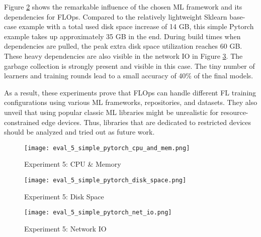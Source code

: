 Figure \ref{fig:eval_5_disk_space} shows the remarkable influence of the chosen ML framework and its dependencies for FLOps.
Compared to the relatively lightweight Sklearn base-case example with a total used disk space increase of 14 GB, this simple Pytorch example takes up approximately 35 GB in the end.
During build times when dependencies are pulled, the peak extra disk space utilization reaches 60 GB.
These heavy dependencies are also visible in the network IO in Figure \ref{fig:eval_5_net_io}.
The garbage collection is strongly present and visible in this case.
The tiny number of learners and training rounds lead to a small accuracy of 40\% of the final models.

As a result, these experiments prove that FLOps can handle different FL training configurations using various ML frameworks, repositories, and datasets.
They also unveil that using popular classic ML libraries might be unrealistic for resource-constrained edge devices.
Thus, libraries that are dedicated to restricted devices should be analyzed and tried out as future work.

\begin{figure}[H]
    \begin{adjustwidth}{-0.2\paperwidth}{-0.2\paperwidth}
        \centering
        \texttt{[image: eval\_5\_simple\_pytorch\_cpu\_and\_mem.png]}
        \caption{Experiment 5: CPU \& Memory}
        \label{fig:eval_5_cpu_mem}
    \end{adjustwidth}
\end{figure}

\begin{figure}[H]
    \begin{adjustwidth}{-0.2\paperwidth}{-0.2\paperwidth}
        \centering
        \texttt{[image: eval\_5\_simple\_pytorch\_disk\_space.png]}
        \caption{Experiment 5: Disk Space}
        \label{fig:eval_5_disk_space}
    \end{adjustwidth}
\end{figure}

\begin{figure}[H]
    \begin{adjustwidth}{-0.2\paperwidth}{-0.2\paperwidth}
        \centering
        \texttt{[image: eval\_5\_simple\_pytorch\_net\_io.png]}
        \caption{Experiment 5: Network IO}
        \label{fig:eval_5_net_io}
    \end{adjustwidth}
\end{figure}

